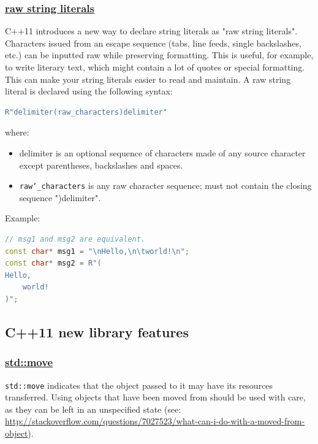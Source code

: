 \subsubsection{\href{https://github.com/AnthonyCalandra/modern-cpp-features/tree/master\#raw-string-literals}
                    {raw string literals}}
C++11 introduces a new way to declare string literals as "raw string literals".
Characters issued from an escape sequence (tabs, line feeds, single backslashes, etc.) 
can be inputted raw while preserving formatting. This is useful, for example, 
to write literary text, which might contain a lot of quotes or special 
formatting. This can make your string literals easier to read and maintain.
\newline
A raw string literal is declared using the following syntax:
\begin{lstlisting}[language=C++]
R"delimiter(raw_characters)delimiter"
\end{lstlisting}
where:
\begin{itemize}
    \item delimiter is an optional sequence of characters made of any 
          source character except parentheses, backslashes and spaces.
    \item \texttt{raw\char`_characters} is any raw character sequence; must not contain 
          the closing sequence ")delimiter".
\end{itemize}

Example:
\begin{lstlisting}[language=C++]
// msg1 and msg2 are equivalent.
const char* msg1 = "\nHello,\n\tworld!\n";
const char* msg2 = R"(
Hello,
	world!
)";
\end{lstlisting}

\newpage
\subsection{C++11 new library features}

\subsubsection{\href{https://github.com/AnthonyCalandra/modern-cpp-features/tree/master\#stdmove}
                    {std::move}}
\texttt{std::move} indicates that the object passed to it may have its 
resources transferred. Using objects that have been moved from should 
be used with care, as they can be left in an unspecified state 
(see: \href{What can I do with a moved-from object?}{http://stackoverflow.com/questions/7027523/what-can-i-do-with-a-moved-from-object}).

